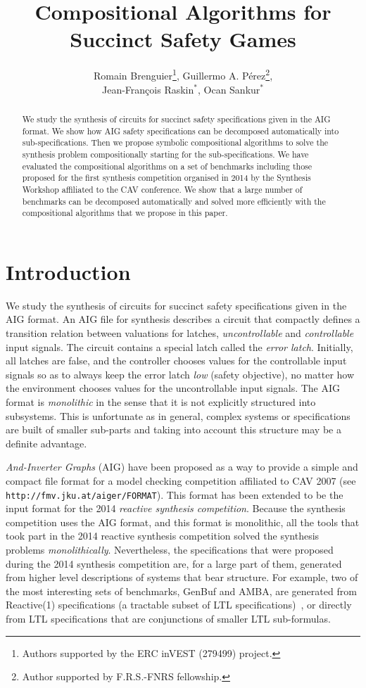 \documentclass[submission,copyright,creativecommons]{eptcs}
\title{Compositional Algorithms for Succinct Safety Games}
\author{
Romain Brenguier\thanks{Authors supported by the ERC inVEST (279499) project.},
Guillermo A. P\'{e}rez\thanks{Author supported by F.R.S.-FNRS fellowship.},\\
Jean-Fran\c{c}ois Raskin$^\ast$\hspace{-1.7mm},
Ocan Sankur$^\ast$\\
\email{\{rbrengui,gperezme,jraskin,osankur\}@ulb.ac.be}
\institute{Universit\'{e} Libre de Bruxelles -- Brussels, Belgium}
}
\begin{document}
\maketitle

\begin{abstract}
We study the synthesis of circuits for succinct safety specifications given in
the AIG format.  We show how AIG safety specifications can be decomposed
automatically into sub-specifications.  Then we propose symbolic compositional
algorithms to solve the synthesis problem compositionally starting for the
sub-specifications.  We have evaluated the compositional algorithms on a set of
benchmarks including those proposed for the first synthesis competition
organised in 2014 by the Synthesis Workshop affiliated to the CAV
conference.  We show that a large number of benchmarks can be decomposed
automatically and solved more efficiently with the compositional algorithms that
we propose in this paper.
\end{abstract}

\section{Introduction}
We study the synthesis of circuits for succinct safety specifications given in
the AIG format.  An AIG file for synthesis describes a circuit that compactly
defines a transition relation between valuations for latches, {\em
uncontrollable} and {\em controllable} input signals.  The circuit contains a
special latch called the {\em error latch}.  Initially, all latches are false,
and the controller chooses values for the controllable input signals so as to
always keep the error latch {\em low} (safety objective), no matter how the
environment chooses values for the uncontrollable input signals. The AIG format
is {\em monolithic} in the sense that it is not explicitly structured into
subsystems.  This is unfortunate as in general, complex systems or
specifications are built of smaller sub-parts and taking into account this
structure may be a definite advantage. 

{\em And-Inverter Graphs} (AIG) have been proposed as a way to provide a simple
and compact file format for a model checking competition affiliated to CAV 2007
(see {\tt http://fmv.jku.at/aiger/FORMAT}). This format has been extended to be
the input format for the 2014 {\em reactive synthesis competition}.  Because the
synthesis competition uses the AIG format, and this format is monolithic, all
the tools that took part in the 2014 reactive synthesis competition solved the
synthesis problems {\em monolithically}. Nevertheless, the specifications that
were proposed during the 2014 synthesis competition are, for a large part of
them, generated from higher level descriptions of systems that bear structure.
For example, two of the most interesting sets of benchmarks, {\sf GenBuf} and
{\sf AMBA}, are generated from Reactive(1) specifications (a tractable subset of
LTL specifications)~\cite{BloemJPPS-jcss12}, or directly from LTL
specifications that are conjunctions of smaller LTL sub-formulas. 
   
\end{document}
